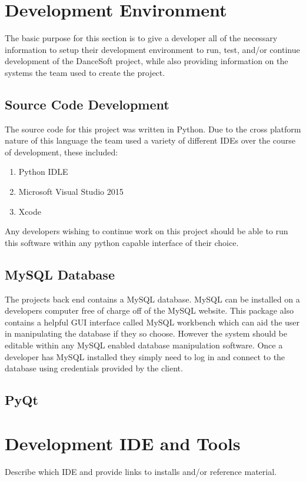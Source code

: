 \section{Development Environment}
The basic purpose for this section is to give a developer all of the necessary information to setup their development environment to run, test, and/or continue development of the DanceSoft project, while also providing information on the systems the team used to create the project.

\subsection{Source Code Development}
The source code for this project was written in Python. Due to the cross platform nature of this language the team used a variety of different IDEs over the course of development, these included:

\begin{enumerate}
\item Python IDLE
\item Microsoft Visual Studio 2015
\item Xcode 
\end{enumerate}

Any developers wishing to continue work on this project should be able to run this software within any python capable interface of their choice.  

\subsection{MySQL Database}
The projects back end contains a MySQL database. MySQL can be installed on a developers computer free of charge off of the MySQL website. This package also contains a helpful GUI interface called MySQL workbench which can aid the user in manipulating the database if they so choose. However the system should be editable within any MySQL enabled database manipulation software. Once a developer has MySQL installed they simply need to log in and connect to the database using credentials provided by the client.

\subsection{PyQt}

\section{Development IDE and Tools}
Describe which IDE and provide links to installs and/or reference material. 

